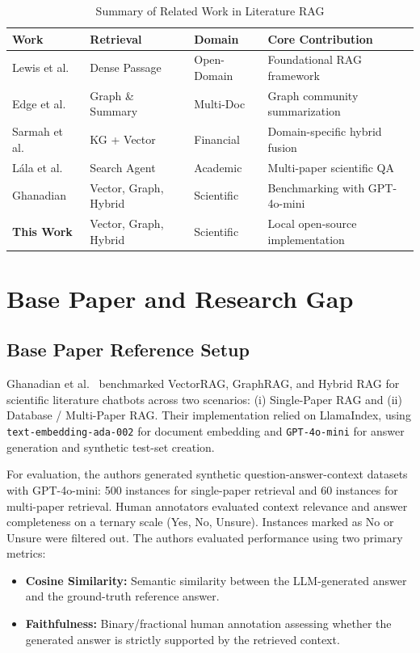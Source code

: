\documentclass[conference]{IEEEtran}
\begin{document}
\begin{table}[t]
\caption{Summary of Related Work in Literature RAG}
\label{tab:related}
\centering
\footnotesize
\begin{tabular}{p{1.4cm}p{1.4cm}p{1.3cm}p{2.6cm}}
\toprule
\textbf{Work} & \textbf{Retrieval} & \textbf{Domain} & \textbf{Core Contribution} \\
\midrule
Lewis et al.\ \cite{lewis2020rag} & Dense Passage & Open-Domain & Foundational RAG framework \\
Edge et al.\ \cite{edge2024graphrag} & Graph \& Summary & Multi-Doc & Graph community summarization \\
Sarmah et al.\ \cite{sarmah2024hybridrag} & KG + Vector & Financial & Domain-specific hybrid fusion \\
L{\'a}la et al.\ \cite{lala2023paperqa} & Search Agent & Academic & Multi-paper scientific QA \\
Ghanadian \cite{ghanadian2026base} & Vector, Graph, Hybrid & Scientific & Benchmarking with GPT-4o-mini \\
\textbf{This Work} & Vector, Graph, Hybrid & Scientific & Local open-source implementation \\
\bottomrule
\end{tabular}
\end{table}


\section{Base Paper and Research Gap}
\label{sec:base}

\subsection{Base Paper Reference Setup}
Ghanadian et al.\ \cite{ghanadian2026base} benchmarked VectorRAG, GraphRAG, and Hybrid RAG for scientific literature chatbots across two scenarios: (i) Single-Paper RAG and (ii) Database / Multi-Paper RAG. Their implementation relied on LlamaIndex, using \texttt{text-embedding-ada-002} for document embedding and \texttt{GPT-4o-mini} for answer generation and synthetic test-set creation.

For evaluation, the authors generated synthetic question-answer-context datasets with GPT-4o-mini: 500 instances for single-paper retrieval and 60 instances for multi-paper retrieval. Human annotators evaluated context relevance and answer completeness on a ternary scale (Yes, No, Unsure). Instances marked as No or Unsure were filtered out. The authors evaluated performance using two primary metrics:
\begin{itemize}
\item \textbf{Cosine Similarity:} Semantic similarity between the LLM-generated answer and the ground-truth reference answer.
\item \textbf{Faithfulness:} Binary/fractional human annotation assessing whether the generated answer is strictly supported by the retrieved context.
\end{itemize}
\end{document}
